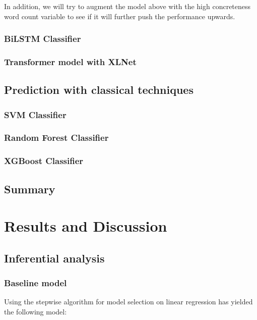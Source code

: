 \documentclass[12pt, a4paper]{article}
\begin{document}
In addition, we will try to augment the model above with the high concreteness word count variable to see if it will further push the performance upwards.

\subsubsection{BiLSTM Classifier}

\subsubsection{Transformer model with XLNet}

\subsection{Prediction with classical techniques}

\subsubsection{SVM Classifier}

\subsubsection{Random Forest Classifier}

\subsubsection{XGBoost Classifier}
\subsection{Summary}

\section{Results and Discussion}

\subsection{Inferential analysis}

\subsubsection{Baseline model}
Using the stepwise algorithm for model selection on linear regression has yielded the following model:
\end{document}

